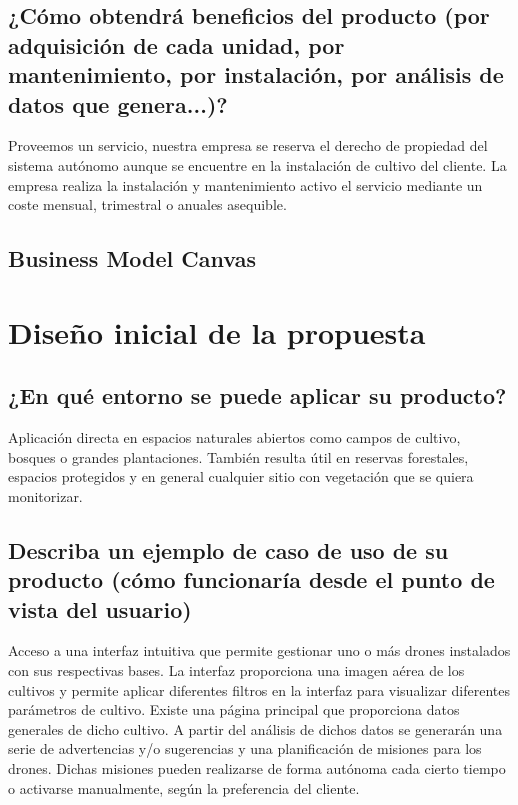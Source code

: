 \documentclass[11pt,spanish]{article} %
\begin{document}
\subsection{¿Cómo obtendrá beneficios del producto (por adquisición de cada unidad, por mantenimiento, por instalación, por análisis de datos que genera...)?}
Proveemos un servicio, nuestra empresa se reserva el derecho de propiedad del sistema autónomo aunque se encuentre en la instalación de cultivo del cliente. La empresa realiza la instalación y mantenimiento activo el servicio mediante un coste mensual, trimestral o anuales asequible.

\subsection{Business Model Canvas}


\section{Diseño inicial de la propuesta}

\subsection{¿En qué entorno se puede aplicar su producto?}
Aplicación directa en espacios naturales abiertos como campos de cultivo, bosques o grandes plantaciones. También resulta útil en reservas forestales, espacios protegidos y en general cualquier sitio con vegetación que se quiera monitorizar.


\subsection{Describa un ejemplo de caso de uso de su producto (cómo funcionaría desde el punto de vista del usuario)}

Acceso a una interfaz intuitiva que permite gestionar uno o más drones instalados con sus respectivas bases. La interfaz proporciona una imagen aérea de los cultivos y permite aplicar diferentes filtros en la interfaz para visualizar diferentes parámetros de cultivo. Existe una página principal que proporciona datos generales de dicho cultivo. A partir del análisis de dichos datos se generarán una serie de advertencias y/o sugerencias y una planificación de misiones para los drones. Dichas misiones pueden realizarse de forma autónoma cada cierto tiempo o activarse manualmente, según la preferencia del cliente.
\end{document}
